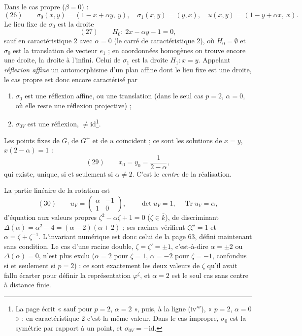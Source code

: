 \documentclass[11pt,a4paper]{article}
\begin{document}
Dans le cas propre ($\beta = 0$) :
\[
  (26) \qquad \sigma_0(x, y) = (1 - x + \alpha y,\ y), \quad
  \sigma_1(x, y) = (y, x), \quad u(x, y) = (1 - y + \alpha x,\ x) .
\]
Le lieu fixe de $\sigma_0$ est la droite
\[
  (27) \qquad H_0 : \ 2x - \alpha y - 1 = 0 ,
\]
sauf en caractéristique $2$ avec $\alpha = 0$ (le carré de caractéristique
$2$), où $H_0 = \emptyset$ et $\sigma_0$ est la translation de vecteur $e_1$ ;
en coordonnées homogènes on trouve encore une droite, la droite à l'infini.
Celui de $\sigma_1$ est la droite $H_1 : x = y$. Appelant \emph{réflexion
affine} un automorphisme d'un plan affine dont le lieu fixe est une droite, le
cas propre est donc encore caractérisé par
\begin{enumerate}
  \item[(iv$'''$)] $\sigma_0$ est une réflexion affine, ou une translation
    (dans le seul cas $p = 2$, $\alpha = 0$, où elle reste une réflexion
    projective) ;
  \item[(iv$^{\mathrm{iv}}$)] $\sigma_{0V}$ est une réflexion, $\neq
    \mathrm{id}$\footnote{La page écrit « sauf pour $p = 2$, $\alpha = 2$ »,
    puis, à la ligne (iv$'''$), « $p = 2$, $\alpha = 0$ » : en caractéristique
    $2$ c'est la même valeur. Dans le cas impropre, $\sigma_0$ est la symétrie
    par rapport à un point, et $\sigma_{0V} = -\mathrm{id}$.}.
\end{enumerate}

Les points fixes de $G$, de $G^{+}$ et de $u$ coïncident ; ce sont les
solutions de $x = y$, $x(2 - \alpha) = 1$ :
\[
  (29) \qquad x_0 = y_0 = \frac{1}{2 - \alpha} ,
\]
qui existe, unique, si et seulement si $\alpha \neq 2$. C'est le \emph{centre}
de la réalisation.

La partie linéaire de la rotation est
\[
  (30) \qquad u_V = \begin{pmatrix} \alpha & -1 \\ 1 & 0 \end{pmatrix}, \qquad
  \det u_V = 1, \quad \operatorname{Tr} u_V = \alpha ,
\]
d'équation aux valeurs propres $\zeta^2 - \alpha\zeta + 1 = 0$ ($\zeta \in
\bar k$), de discriminant $\Delta(\alpha) = \alpha^2 - 4 = (\alpha -
2)(\alpha + 2)$ ; ses racines vérifient $\zeta\zeta' = 1$ et $\alpha = \zeta +
\zeta^{-1}$. L'invariant numérique est donc celui de la page 63, défini
maintenant sans condition. Le cas d'une racine double, $\zeta = \zeta' = \pm
1$, c'est-à-dire $\alpha = \pm 2$ ou $\Delta(\alpha) = 0$, n'est plus exclu
($\alpha = 2$ pour $\zeta = 1$, $\alpha = -2$ pour $\zeta = -1$, confondus
si et seulement si $p = 2$) : ce sont exactement les deux valeurs de $\zeta$
qu'il avait fallu écarter pour définir la représentation $\varphi^\zeta$, et
$\alpha = 2$ est le seul cas sans centre à distance finie.
\end{document}
